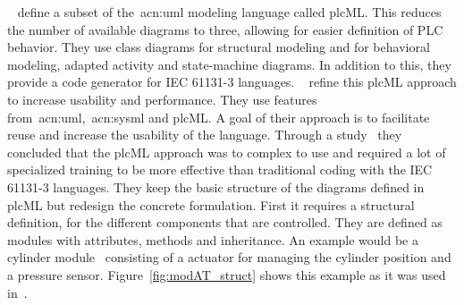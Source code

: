 \citeauthor{WITSCH2015}~\cite{WITSCH2015, WITSCH20117866} define a subset of the~\acrshort{acn:uml} modeling language called plcML.
This reduces the number of available diagrams to three, allowing for easier definition of PLC behavior.
They use class diagrams for structural modeling and for behavioral modeling, adapted activity and state-machine diagrams.
In addition to this, they provide a code generator for IEC 61131-3 languages.
\citeauthor{Obermeier:2015aa}~\cite{Obermeier:2015aa} refine this plcML approach to increase usability and performance.
They use features from~\acrshort{acn:uml},~\acrshort{acn:sysml} and plcML.
A goal of their approach is to facilitate reuse and increase the usability of the language.
Through a study~\cite{6315074} they concluded that the plcML approach was to complex to use and required a lot of specialized training to be more effective than traditional coding with the IEC 61131-3 languages.
They keep the basic structure of the diagrams defined in plcML but redesign the concrete formulation.
First it requires a structural definition, for the different components that are controlled.
They are defined as modules with attributes, methods and inheritance.
An example would be a cylinder module~\cite{Obermeier:2015aa} consisting of a actuator for managing the cylinder position and a pressure sensor.
Figure~\ref{fig:modAT_struct} shows this example as it was used in~\cite{Obermeier:2015aa}.
